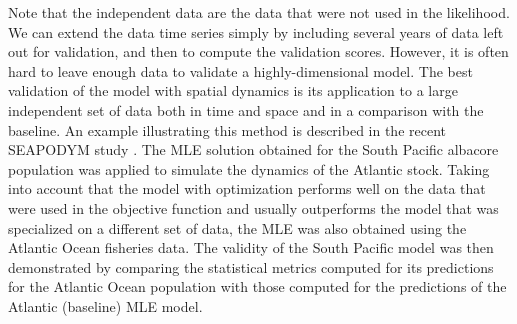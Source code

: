Note that the independent data are the data that were not used in the likelihood. We can extend the data time series simply by including several years of data left out for validation, and then to compute the validation scores. However, it is often hard to leave enough data to validate a highly-dimensional model. The best validation of the model with spatial dynamics is its application to a large independent set of data both in time and space and in a comparison with the baseline. An example illustrating this method is described in the recent SEAPODYM study \citep{Senina20a}. The MLE solution obtained for the South Pacific albacore population was applied to simulate the dynamics of the Atlantic stock. Taking into account that the model with optimization performs well on the data that were used in the objective function and usually outperforms the model that was specialized on a different set of data, the MLE was also obtained using the Atlantic Ocean fisheries data. The validity of the South Pacific model was then demonstrated by comparing the statistical metrics computed for its predictions for the Atlantic Ocean population with those computed for the predictions of the Atlantic (baseline) MLE model. 




